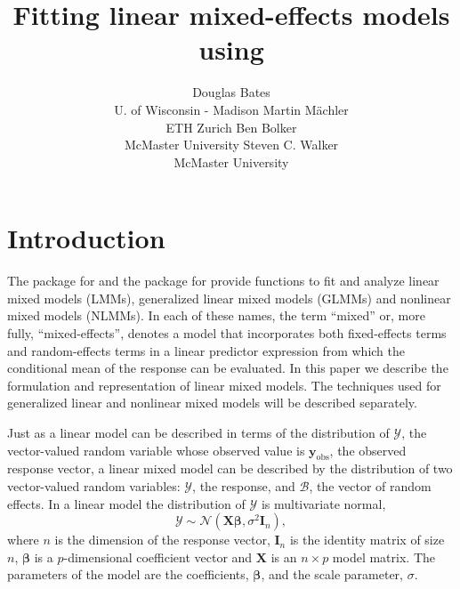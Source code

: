 \documentclass{jss}
\author{Douglas Bates\\U. of Wisconsin - Madison\And
  Martin M\"achler\\ETH Zurich\And
  Ben Bolker\\McMaster University\And
  Steven C. Walker\\McMaster University
}
\title{Fitting linear mixed-effects models using \pkg{lme4}}
\newcommand{\mc}[1]{\ensuremath{\mathcal{#1}}}
\newcommand{\yobs}{\ensuremath{\bm y_{\mathrm{obs}}}}
\begin{document}
\section{Introduction}
\label{sec:intro}

The  package for  and the 
package for  provide functions to fit and analyze
linear mixed models (LMMs), generalized linear mixed models (GLMMs)
and nonlinear mixed models (NLMMs).  In each of these names, the term
``mixed'' or, more fully, ``mixed-effects'', denotes a model that
incorporates both fixed-effects terms and random-effects terms in a
linear predictor expression from which the conditional mean of the
response can be evaluated.  In this paper we describe the formulation
and representation of linear mixed models.  The techniques used for
generalized linear and nonlinear mixed models will be described
separately.

Just as a linear model can be described in terms of the distribution
of $\mc{Y}$, the vector-valued random variable whose observed value is
$\yobs$, the observed response vector, a linear mixed model can be
described by the distribution of two vector-valued random variables:
$\mc{Y}$, the response, and $\mc{B}$, the vector of random effects.  In
a linear model the distribution of $\mc Y$ is multivariate normal,%
\begin{equation}
  \label{eq:linearmodel}
  \mc Y\sim\mc{N}(\bm X\bm\beta,\sigma^2\bm I_n),
\end{equation}%
where $n$ is the dimension of the response vector, $\bm I_n$ is the
identity matrix of size $n$, $\bm\beta$ is a $p$-dimensional
coefficient vector and $\bm X$ is an $n\times p$ model matrix. The
parameters of the model are the coefficients, $\bm\beta$, and the
scale parameter, $\sigma$.
\end{document}
